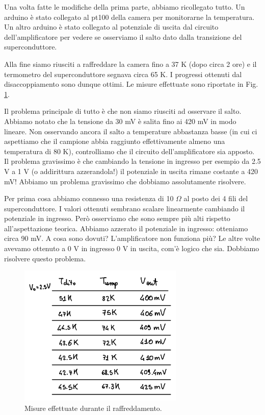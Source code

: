 \documentclass[../main/main.tex]{subfiles}
\begin{document}
Una volta fatte le modifiche della prima parte, abbiamo ricollegato tutto. Un arduino è stato collegato al pt100 della camera per monitorarne la temperatura. Un altro arduino è stato collegato al potenziale di uscita dal circuito dell'amplificatore per vedere se osserviamo il salto dato dalla transizione del superconduttore.

Alla fine siamo riusciti a raffreddare la camera fino a 37 K (dopo circa 2 ore) e il termometro del superconduttore segnava circa 65 K. I progressi ottenuti dal disaccoppiamento sono dunque ottimi. Le misure effettuate sono riportate in Fig. \ref{fig:15_1}.

Il problema principale di tutto è che non siamo riusciti ad osservare il salto. Abbiamo notato che la tensione da 30 mV è salita fino ai 420 mV in modo lineare. Non osservando ancora il salto a temperature abbastanza basse (in cui ci aspettiamo che il campione abbia raggiunto effettivamente almeno una temperatura di 80 K), controlliamo che il circuito dell'amplificatore sia apposto. Il problema gravissimo è che cambiando la tensione in ingresso per esempio da 2.5 V a 1 V (o addirittura azzerandola!) il potenziale in uscita rimane costante a 420 mV! Abbiamo un problema gravissimo che dobbiamo assolutamente risolvere.

Per prima cosa abbiamo connesso una resistenza di 10 \( \Omega  \) al posto dei 4 fili del superconduttore. I valori ottenuti sembrano scalare linearmente cambiando il potenziale in ingresso. Però osserviamo che sono sempre più alti rispetto all'aspettazione teorica. Abbiamo azzerato il potenziale in ingresso: otteniamo circa 90 mV. A cosa sono dovuti? L'amplificatore non funziona più? Le altre volte avevamo ottenuto a 0 V in ingresso 0 V in uscita, com'è logico che sia. Dobbiamo risolvere questo problema.


\begin{figure}[h!]
\centering
\includegraphics[width=0.7\textwidth]{../lessons/image/15/1.png}
\caption{\label{fig:15_1} Misure effettuate durante il raffreddamento.}
\end{figure}
\end{document}
